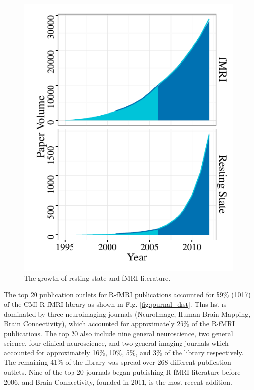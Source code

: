 \documentclass[12pt,5p]{elsarticle}
\begin{document}
\begin{figure}
  \begin{center}
    \includegraphics[]{figures/overall_growth}%
    \caption{The growth of resting state and fMRI literature.
        \label{fig:overallgrowth}
    }
  \end{center}
\end{figure}


The top 20 publication outlets for R-fMRI publications accounted for 59\%
(1017) of the CMI R-fMRI library as shown in Fig. \ref{fig:journal_dist}.
This list is dominated by three neuroimaging journals (NeuroImage, Human
Brain Mapping, Brain Connectivity), which accounted for approximately 26\%
of the R-fMRI publications. The top 20 also include nine general
neuroscience, two general science, four clinical neuroscience, and two
general imaging journals which accounted for approximately 16\%, 10\%,
5\%, and 3\% of the library respectively. The remaining 41\% of the
library was spread over 268 different publication outlets. Nine of the top
20 journals began publishing R-fMRI literature before 2006, and Brain
Connectivity, founded in 2011, is the most recent addition.  
\end{document}
